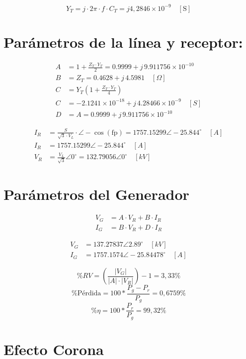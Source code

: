 \[
Y_T = j\cdot2\pi \cdot f \cdot C_T = j4,\!2846 \times 10^{-9} \quad [\text{S}]
\]

\section*{Parámetros de la línea y receptor:}

\begin{align*}
A &= 1 + \frac{Z_T \cdot Y_T}{2} = 0.9999 + j\,9.911756 \times 10^{-10} \\
B &= Z_T = 0.4628 + j\,4.5981 \quad [\Omega] \\
C &= Y_T \left(1 + \frac{Z_T \cdot Y_T}{4} \right) \\
C &= -2.1241 \times 10^{-18} + j\,4.28466 \times 10^{-9} \quad [S] \\
D &= A = 0.9999 + j\,9.911756 \times 10^{-10}
\end{align*}

\begin{align*}
I_R &= \frac{S}{\sqrt{3} \cdot V_L} \cdot \angle -\cos(\text{fp}) = 1757.15299 \angle -25.844^\circ \quad [A] \\
I_R &= 1757.15299 \angle -25.844^\circ \quad [A] \\
V_R &= \frac{V_L}{\sqrt{3}} \angle 0^\circ = 132.79056 \angle 0^\circ \quad [kV]
\end{align*}

\section*{Parámetros del Generador}

\begin{align*}
V_G &= A \cdot V_R + B \cdot I_R \\
I_G &= B \cdot V_R + D \cdot I_R
\end{align*}

\begin{align*}
V_G &= 137.27837 \angle 2.89^\circ \quad [kV] \\
I_G &= 1757.1574 \angle -25.84478^\circ \quad [A]
\end{align*}

\[
\%RV = \left( \frac{ |V_G| }{ |A| \cdot |V_R| } \right) - 1 = 3{,}33\%
\]
\[
\% \text{Pérdida} = 100*\frac{P_g - P_r}{P_g} = 0{,}6759\%
\]
\[
\% \eta =100* \frac{P_r}{P_g} = 99{,}32\%
\]

\section*{Efecto Corona}

